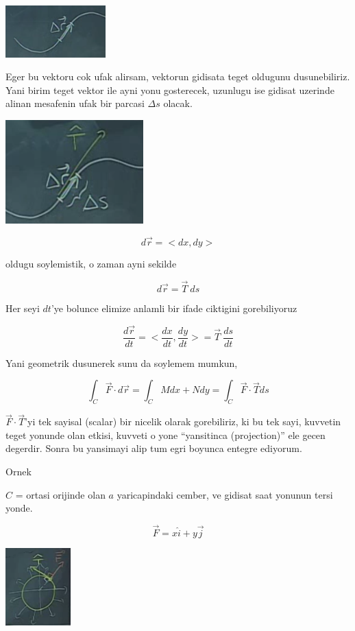 \documentclass[12pt,fleqn]{article}
\begin{document}
\includegraphics[height=2cm]{19_11.png}

Eger bu vektoru cok ufak alirsam, vektorun gidisata teget oldugunu
dusunebiliriz. Yani birim teget vektor ile ayni yonu gosterecek, uzunlugu
ise gidisat uzerinde alinan mesafenin ufak bir parcasi $\Delta s$ olacak. 

\includegraphics[height=4cm]{19_12.png}

\[ d\vec{r} = <dx, dy> \]
 
oldugu soylemistik, o zaman ayni sekilde

\[  d\vec{r} = \vec{T} \ ds \]

Her seyi $dt$'ye bolunce elimize anlamli bir ifade ciktigini gorebiliyoruz

\[ \frac{d\vec{r}}{dt} = <\frac{dx}{dt}, \frac{dy}{dt}> 
= \vec{T} \ \frac{ds}{dt} 
\]

Yani geometrik dusunerek sunu da soylemem mumkun,

\[  \int_C \vec{F} \cdot d\vec{r}  = \int_C M dx + N dy
=  \int_C \vec{F} \cdot \vec{T} ds
\]

$\vec{F} \cdot \vec{T}$'yi tek sayisal (scalar) bir nicelik olarak gorebiliriz, ki bu tek 
sayi, kuvvetin teget yonunde olan etkisi, kuvveti o yone 
``yansitinca (projection)'' ele gecen degerdir. Sonra bu yansimayi alip
tum egri boyunca entegre ediyorum. 

Ornek

$C$ = ortasi orijinde olan $a$ yaricapindaki cember, ve gidisat saat
yonunun tersi yonde.

\[ \vec{F} = x\hat{i} + y\vec{j} \]

\includegraphics[height=3cm]{19_13.png}
\end{document}
